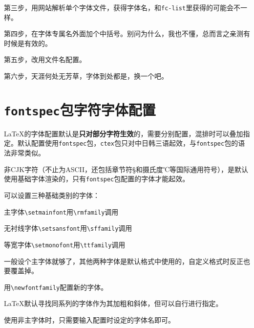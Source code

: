 \documentclass[10pt,openany]{book}
\begin{document}
\begin{sloppypar}
第三步，用网站解析单个字体文件，获得字体名，和\texttt{fc-list}里获得的可能会不一样。

第四步，在字体专属名外面加个中括号。别问为什么，我也不懂，总而言之亲测有时候是有效的。



第五步，改用文件名配置。

第六步，天涯何处无芳草，字体到处都是，换一个吧。

\section{\texorpdfstring{\texttt{fontspec}包字符字体配置}{fontspec包字符字体配置}}

 {\LaTeX}的字体配置默认是\textbf{只对部分字符生效}的，需要分别配置，混排时可以叠加指定。默认配置使用\texttt{fontspec}包，\texttt{ctex}包只对中日韩三语起效，与\texttt{fontspec}包的语法非常类似。

非CJK字符（不止为ASCII，还包括章节符{\S}和摄氏度{\tempfont ℃}等国际通用符号），是默认使用基础字体渲染的，只有\texttt{fontspec}包配置的字体才能起效。



可以设置三种基础类别的字体：

\begin{tightitem}
    \item 主字体\texttt{\textbackslash{}setmainfont}用\texttt{\textbackslash{}rmfamily}调用
    \item 无衬线字体\texttt{\textbackslash{}setsansfont}用\texttt{\textbackslash{}sffamily}调用
    \item 等宽字体\texttt{\textbackslash{}setmonofont}用\texttt{\textbackslash{}ttfamily}调用
\end{tightitem}

一般设个主字体就够了，其他两种字体是默认格式中使用的，自定义格式时反正也要覆盖掉。

用\texttt{\textbackslash{}newfontfamily}配置新的字体。



{\LaTeX}默认寻找同系列的字体作为其加粗和斜体，但可以自行进行指定。



使用非主字体时，只需要输入配置时设定的字体名即可。


\end{sloppypar}
\end{document}
